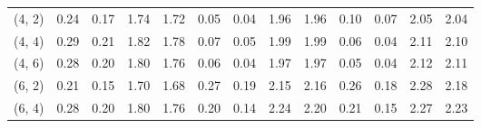 \begin{tabular}{lrrrrrrrrrrrr}
(4, 2)        &                                               0.24 &                                            0.17 &                            1.74 &                                  1.72 &                                               0.05 &                                            0.04 &                            1.96 &                                  1.96 &                                               0.10 &                                            0.07 &                            2.05 &                                  2.04 \\
(4, 4)        &                                               0.29 &                                            0.21 &                            1.82 &                                  1.78 &                                               0.07 &                                            0.05 &                            1.99 &                                  1.99 &                                               0.06 &                                            0.04 &                            2.11 &                                  2.10 \\
(4, 6)        &                                               0.28 &                                            0.20 &                            1.80 &                                  1.76 &                                               0.06 &                                            0.04 &                            1.97 &                                  1.97 &                                               0.05 &                                            0.04 &                            2.12 &                                  2.11 \\
(6, 2)        &                                               0.21 &                                            0.15 &                            1.70 &                                  1.68 &                                               0.27 &                                            0.19 &                            2.15 &                                  2.16 &                                               0.26 &                                            0.18 &                            2.28 &                                  2.18 \\
(6, 4)        &                                               0.28 &                                            0.20 &                            1.80 &                                  1.76 &                                               0.20 &                                            0.14 &                            2.24 &                                  2.20 &                                               0.21 &                                            0.15 &                            2.27 &                                  2.23 \\

\end{tabular}
